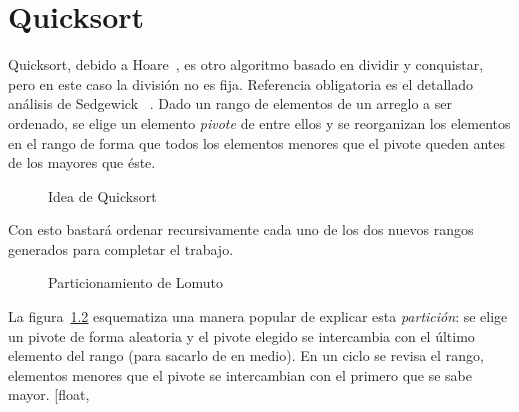 


\chapter{Quicksort}
\label{cha:quicksort}

  Quicksort,
  debido a Hoare~\cite{hoare62:_quicksort},
  es otro algoritmo basado en dividir y conquistar,
  pero en este caso la división no es fija.
  Referencia obligatoria es el detallado análisis de Sedgewick~%
    \cite{sedgewick77:_analysis_quicksort}.
  Dado un rango de elementos de un arreglo a ser ordenado,
  se elige un elemento \emph{pivote} de entre ellos
  y se reorganizan los elementos en el rango
  de forma que todos los elementos menores que el pivote
  queden antes de los mayores que éste.
  \begin{figure}[htbp]
    \centering
    \caption{Idea de Quicksort}
    \label{fig:qsort:idea}
  \end{figure}
  Con esto bastará ordenar recursivamente cada uno
  de los dos nuevos rangos generados
  para completar el trabajo.
  \begin{figure}[htbp]
    \centering
    \caption{Particionamiento de Lomuto}
    \label{fig:qsort:Lomuto}
  \end{figure}
  La figura~\ref{fig:qsort:Lomuto}
  esquematiza una manera popular de explicar esta \emph{partición}:
  se elige un pivote de forma aleatoria
  y el pivote elegido se intercambia con el último elemento del rango
  (para sacarlo de en medio).
  En un ciclo se revisa el rango,
  elementos menores que el pivote
  se intercambian con el primero que se sabe mayor.
  [float,
